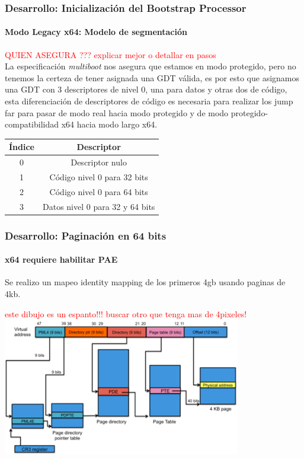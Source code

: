 \documentclass{beamer}
\begin{document}
\begin{frame}
  \frametitle{Desarrollo: Inicialización del Bootstrap Processor} %
  \framesubtitle{Modo Legacy x64: Modelo de segmentación}
  \huge \textcolor{red}{QUIEN ASEGURA ??? explicar mejor o detallar en pasos} \\ %
  \small
  La especificación \emph{multiboot} nos asegura que estamos en modo protegido, pero no tenemos la certeza de tener asignada una GDT válida, es por esto que asignamos una GDT con 3 descriptores de nivel 0, una para datos y otras dos de código, esta diferenciación de descriptores de código es necesaria para realizar los jump far para pasar de modo real hacia modo protegido y de modo protegido-compatibilidad x64 hacia modo largo x64.
  \begin{center}
  \begin{tabular}{|c|c|}
  \hline
  Índice & Descriptor\\
  \hline
  0 & Descriptor nulo\\
  \hline
  1 & Código nivel 0 para 32 bits\\
  \hline
  2 & Código nivel 0 para 64 bits\\
  \hline
  3 & Datos nivel 0 para 32 y 64 bits\\
  \hline
  \end{tabular}
  \end{center}
\end{frame}

\begin{frame}
  \frametitle{Desarrollo: Paginación en 64 bits}
  \framesubtitle{x64 requiere habilitar PAE}
  Se realizo un mapeo identity mapping de los primeros 4gb usando paginas de 4kb.
  \begin{center}
  \huge \textcolor{red}{este dibujo es un espanto!!! buscar otro que tenga mas de 4pixeles!}
  \includegraphics[height=6cm]{images/ia32-paging-overview.png} 
  \end{center}
\end{frame}
\end{document}
